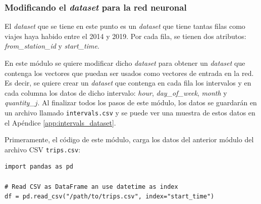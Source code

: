 
\subsubsection{Modificando el \textit{dataset} para la red neuronal}\label{dataset-creation}

El \textit{dataset} que se tiene en este punto es un \textit{dataset} que tiene tantas filas como viajes haya habido entre el 2014 y 2019. Por cada fila, se tienen dos atributos: \textit{from\_station\_id} y \textit{start\_time}. 
\newline

En este módulo se quiere modificar dicho \textit{dataset} para obtener un \textit{dataset} que contenga los vectores que puedan ser usados como vectores de entrada en la red. Es decir, se quiere crear un \textit{dataset} que contenga en cada fila los intervalos y en cada columna los datos de dicho intervalo: \textit{hour}, \textit{day\_of\_week}, \textit{month} y \textit{quantity\_$j$}. Al finalizar todos los pasos de este módulo, los datos se guardarán en un archivo llamado \small{\verb|intervals.csv|} y se puede ver una muestra de estos datos en el Apéndice \ref{app:intervals_dataset}.
\newline

Primeramente, el código de este módulo, carga los datos del anterior módulo del archivo CSV \small{\verb|trips.csv|}:
\begin{verbatim}
import pandas as pd

# Read CSV as DataFrame an use datetime as index
df = pd.read_csv("/path/to/trips.csv", index="start_time")
\end{verbatim}

